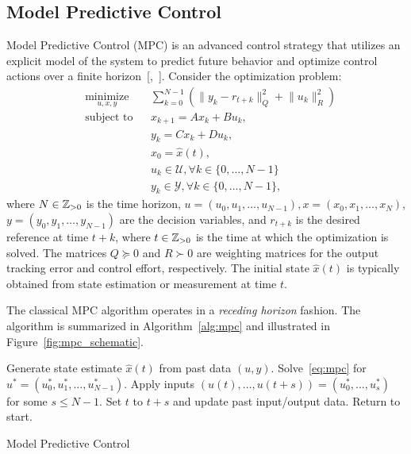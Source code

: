 \subsection{Model Predictive Control}\label{sec:mpc}
Model Predictive Control (MPC) is an advanced control strategy that utilizes an explicit model of the system to predict future behavior and optimize control actions over a finite horizon~[\cite{camacho2007},~\cite{ferramosca2009}]. Consider the optimization problem:
\begin{equation}\label{eq:mpc}
    \begin{aligned}
        & \underset{u,x,y}{\text{minimize}} && \sum_{k=0}^{N-1} \left( \lVert y_k - r_{t+k} \rVert_Q^2 + \lVert u_k \rVert_R^2 \right) \\
        & \text{subject to} && x_{k+1} = A x_k + B u_k, \\
        & && y_k = C x_k + D u_k, \\
        & && x_0 = \hat{x}(t), \\
        & && u_k \in \mathcal{U}, \forall k \in \{0, \ldots, N-1\} \\
        & && y_k \in \mathcal{Y}, \forall k \in \{0, \ldots, N-1\},
    \end{aligned}
\end{equation}
where $N \in \mathbb{Z}_{> 0}$ is the time horizon, $u = (u_0, u_1, \ldots, u_{N-1}), x = (x_0, x_1, \ldots, x_N)$, $y = (y_0, y_1, \ldots, y_{N-1})$ are the decision variables, and $r_{t+k}$ is the desired reference at time $t+k$, where $t \in \mathbb{Z}_{>0}$ is the time at which the optimization is solved. The matrices $Q \succeq 0$ and $R \succ 0$ are weighting matrices for the output tracking error and control effort, respectively. The initial state $\hat{x}(t)$ is typically obtained from state estimation or measurement at time $t$.

The classical MPC algorithm operates in a \emph{receding horizon} fashion. The algorithm is summarized in Algorithm~\ref{alg:mpc} and illustrated in Figure~\ref{fig:mpc_schematic}.

\begin{algorithm}[H]
    \BlankLine
        Generate state estimate $\hat{x}(t)$ from past data $(u,y)$.\;
        Solve~\eqref{eq:mpc} for $u^* = (u_0^*, u_1^*, \ldots, u_{N-1}^*)$.\;
        Apply inputs $(u(t), \ldots, u(t+s)) = (u^*_0, \ldots, u^*_s)$ for some $s \leq N-1$.\;
  	    Set $t$ to $t+s$ and update past input/output data.\;
        Return to start.
    \caption{Model Predictive Control}
    \label{alg:mpc}
\end{algorithm}

